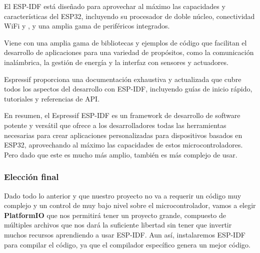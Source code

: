 El ESP-IDF está diseñado para aprovechar al máximo las capacidades y características del ESP32, incluyendo su procesador de doble núcleo, conectividad \gls{WiFi} y , y una amplia gama de periféricos integrados.

Viene con una amplia gama de bibliotecas y ejemplos de código que facilitan el desarrollo de aplicaciones para una variedad de propósitos, como la comunicación inalámbrica, la gestión de energía y la interfaz con sensores y actuadores.

Espressif proporciona una documentación exhaustiva y actualizada que cubre todos los aspectos del desarrollo con ESP-IDF, incluyendo guías de inicio rápido, tutoriales y referencias de \gls{API}.

En resumen, el Espressif ESP-IDF es un framework de desarrollo de software potente y versátil que ofrece a los desarrolladores todas las herramientas necesarias para crear aplicaciones personalizadas para dispositivos basados en ESP32, aprovechando al máximo las capacidades de estos microcontroladores. Pero dado que este es mucho más amplio, también es más complejo de usar.

\subsubsection{Elección final}

Dado todo lo anterior y que nuestro proyecto no va a requerir un código muy complejo y un control de muy bajo nivel sobre el microcontrolador, vamos a elegir \textbf{PlatformIO} que nos permitirá tener un proyecto grande, compuesto de múltiples archivos que nos dará la suficiente libertad sin tener que invertir muchos recursos aprendiendo a usar ESP-IDF. Aun así, instalaremos ESP-IDF para compilar el código, ya que el compilador específico genera un mejor código.
\newpage
